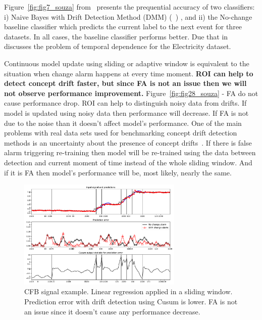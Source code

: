 \documentclass[12 pt]{article}
\begin{document}
  Figure~\ref{fig:fig7_souza} from~\cite{SouzaRMB20} presents the prequential accuracy of two classifiers: i) Naive Bayes with Drift Detection Method (DMM) (~\cite{gama2004learning}) , and ii) the No-change baseline classifier which predicts the current label to the next event for three datasets. In all cases, the baseline classifier performs better.
  Due that in~\cite{zliobaite2013good} discusses the problem of temporal dependence for the Electricity dataset.

  Continuous model update using sliding or adaptive window is equivalent to the situation when change alarm happens at every time moment.
  \textbf{ROI can help to detect concept drift faster, but since FA is not an issue then we will not observe performance improvement.}
  Figure~\ref{fig:fig28_souza} - FA do not cause performance drop.
  ROI can help to distinguish noisy data from drifts. If model is updated using noisy data then performance will decrease.
  If FA is not due to the noise than it doesn't affect model's performance. 
  One of the main problems with real data sets used for benchmarking concept drift detection methods is an uncertainty about the presence of concept drifts~\cite{SouzaRMB20}.
  If there is false alarm triggering re-training then model will be re-trained using the data between detection and current moment of time instead of the whole sliding window.
  And if it is FA then model's performance will be, most likely, nearly the same.

  \begin{figure}[!htb]
    \centering
    \includegraphics[width=0.7\textwidth]{images/proof_of_concept_linreg_cfb_sig}
    \caption{CFB signal example.  Linear regression applied in a sliding window.  Prediction error with drift detection using Cusum is lower.  FA is not an issue since it doesn't cause any performance decrease.}\label{fig:cfb_sig_linreg_proof_of_concept}
  \end{figure}
\end{document}
